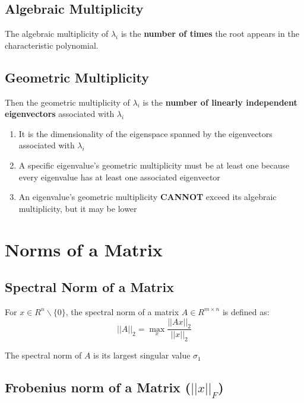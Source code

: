 \subsection{Algebraic Multiplicity}\label{Algebraic Multiplicity}
The algebraic multiplicity of $\lambda_i$ is the \textbf{number of times} the root appears in the characteristic polynomial.


\subsection{Geometric Multiplicity}\label{Geometric Multiplicity}

Then the geometric multiplicity of $\lambda_i$ is the \textbf{number of linearly independent eigenvectors} associated with $\lambda_i$

\begin{enumerate}
    \item It is the dimensionality of the eigenspace spanned by the eigenvectors associated with $\lambda_i$

    \item A specific eigenvalue’s geometric multiplicity must be at least one because every eigenvalue has at least one associated eigenvector

    \item An eigenvalue’s geometric multiplicity \textbf{CANNOT} exceed its algebraic multiplicity, but it may be lower
\end{enumerate}


\section{Norms of a Matrix}\label{Norms of a Matrix}

\subsection{Spectral Norm of a Matrix}\label{Spectral Norm of a Matrix}
For $x \in  R^n\backslash \{0\}$, the spectral norm of a matrix $A \in  R^{m\times n}$ is defined as:
\[
    \displaystyle
    ||A||_2 = \max_x \dfrac{||Ax||_2}{||x||_2}
\]


\begin{theorem}
    The spectral norm of $A$ is its largest singular value $\sigma_1$
\end{theorem}


\subsection{Frobenius norm of a Matrix ($||x||_F$) \cite{wiki/Matrix_norm}}\label{Frobenius norm of a Matrix}

